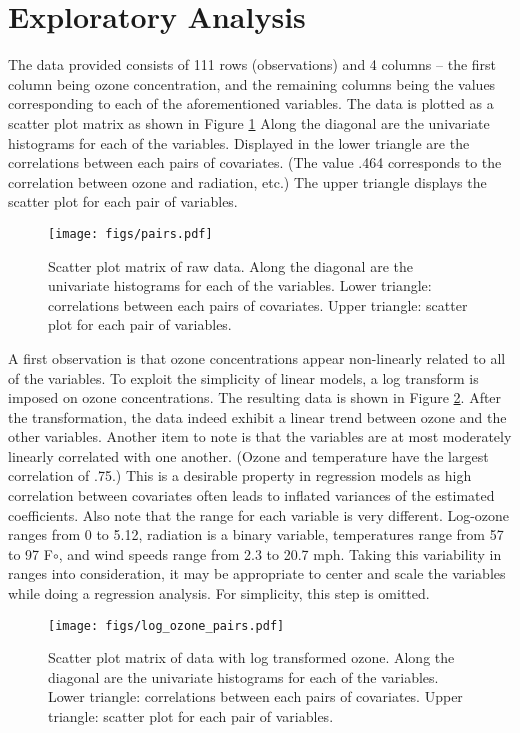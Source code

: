 \documentclass{../../tex_template/asaproc}
\begin{document}
\section{Exploratory Analysis}
The data provided consists of 111 rows (observations) and 4 columns -- the
first column being ozone concentration, and the remaining columns being the
values corresponding to each of the aforementioned variables. The data is
plotted as a scatter plot matrix as shown in Figure \ref{fig:pairs} Along the
diagonal are the univariate histograms for each of the variables. Displayed in the
lower triangle are the correlations between each pairs of covariates. (The 
value .464 corresponds to the correlation between ozone and radiation, etc.)
The upper triangle displays the scatter plot for each pair of variables.\\

\begin{figure}[H]
  \texttt{[image: figs/pairs.pdf]}
  \caption{\small Scatter plot matrix of raw data. Along the diagonal are the
  univariate histograms for each of the variables. Lower triangle: correlations
  between each pairs of covariates. Upper triangle: scatter plot
  for each pair of variables.}
  \label{fig:pairs}
\end{figure}

A first observation is that ozone concentrations appear non-linearly related to
all of the variables. To exploit the simplicity of linear models, a log
transform is imposed on ozone concentrations. The resulting data is shown in
Figure \ref{fig:logpairs}. After the transformation, the data indeed exhibit a
linear trend between ozone and the other variables. Another item to note is
that the variables are at most moderately linearly correlated with one another.
(Ozone and temperature have the largest correlation of .75.) This is a
desirable property in regression models as high correlation between covariates
often leads to inflated variances of the estimated coefficients. Also note that
the range for each variable is very different. Log-ozone ranges from 0 to 5.12,
radiation is a binary variable, temperatures range from 57 to 97 F$\circ$, and
wind speeds range from 2.3 to 20.7 mph. Taking this variability in ranges into
consideration, it may be appropriate to center and scale the variables while
doing a regression analysis. For simplicity, this step is omitted.

\begin{figure}[H]
  \texttt{[image: figs/log\_ozone\_pairs.pdf]}
  \caption{\small Scatter plot matrix of data with log transformed ozone. Along
  the diagonal are the univariate histograms for each of the variables. Lower
  triangle: correlations between each pairs of covariates. Upper triangle:
  scatter plot for each pair of variables.}
  \label{fig:logpairs}
\end{figure}
\end{document}
